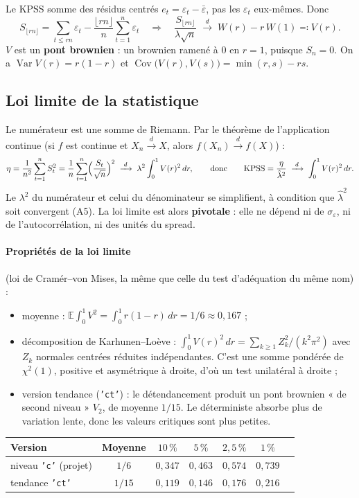 \documentclass[11pt,a4paper]{article}
\newcommand{\E}{\mathbb{E}}
\newcommand{\Var}{\operatorname{Var}}
\newcommand{\Cov}{\operatorname{Cov}}
\newcommand{\KPSS}{\mathrm{KPSS}}
\newcommand{\dto}{\xrightarrow{\;d\;}}
\newcommand{\lhat}{\hat\lambda^2}
\newcommand{\code}[1]{\texttt{#1}}
\theoremstyle{definition}
\begin{document}
Le KPSS somme des résidus centrés $e_t = \varepsilon_t - \bar\varepsilon$, pas les $\varepsilon_t$ eux-mêmes. Donc
\[
S_{\lfloor rn\rfloor} = \sum_{t \le rn}\varepsilon_t - \frac{\lfloor rn\rfloor}{n}\sum_{t=1}^{n}\varepsilon_t
\quad\Longrightarrow\quad
\frac{S_{\lfloor rn\rfloor}}{\lambda\sqrt n} \;\dto\; W(r) - r\,W(1) \eqqcolon V(r).
\]
$V$ est un \textbf{pont brownien} : un brownien ramené à $0$ en $r = 1$, puisque $S_n = 0$. On a $\Var V(r) = r(1-r)$ et $\Cov\bigl(V(r),V(s)\bigr) = \min(r,s) - rs$.

\subsection{Loi limite de la statistique}

Le numérateur est une somme de Riemann. Par le théorème de l'application continue (si $f$ est continue et $X_n \dto X$, alors $f(X_n) \dto f(X)$) :
\[
\eta = \frac{1}{n^2}\sum_{t=1}^{n}S_t^2 = \frac{1}{n}\sum_{t=1}^{n}\Bigl(\frac{S_t}{\sqrt n}\Bigr)^2 \;\dto\; \lambda^2\int_0^1 V(r)^2\,dr,
\qquad\text{donc}\qquad
\KPSS = \frac{\eta}{\lhat} \;\dto\; \int_0^1 V(r)^2\,dr .
\]
Le $\lambda^2$ du numérateur et celui du dénominateur se simplifient, à condition que $\lhat$ soit convergent (A5). La loi limite est alors \textbf{pivotale} : elle ne dépend ni de $\sigma_\varepsilon$, ni de l'autocorrélation, ni des unités du spread.

\paragraph{Propriétés de la loi limite} (loi de Cramér--von Mises, la même que celle du test d'adéquation du même nom) :
\begin{itemize}
\item moyenne : $\E\int_0^1 V^2 = \int_0^1 r(1-r)\,dr = 1/6 \approx 0{,}167$ ;
\item décomposition de Karhunen--Loève : $\int_0^1 V(r)^2\,dr = \sum_{k\ge1} Z_k^2/(k^2\pi^2)$ avec $Z_k$ normales centrées réduites indépendantes. C'est une somme pondérée de $\chi^2(1)$, positive et asymétrique à droite, d'où un test unilatéral à droite ;
\item version tendance (\code{'ct'}) : le détendancement produit un pont brownien « de second niveau » $V_2$, de moyenne $1/15$. Le déterministe absorbe plus de variation lente, donc les valeurs critiques sont plus petites.
\end{itemize}

\begin{center}
\begin{tabular}{@{}lcccccc@{}}
\toprule
Version & Moyenne & $10\,\%$ & $5\,\%$ & $2{,}5\,\%$ & $1\,\%$ \\
\midrule
niveau \code{'c'} (projet) & $1/6$ & $0{,}347$ & $0{,}463$ & $0{,}574$ & $0{,}739$ \\
tendance \code{'ct'} & $1/15$ & $0{,}119$ & $0{,}146$ & $0{,}176$ & $0{,}216$ \\
\bottomrule
\end{tabular}
\end{center}
\end{document}
